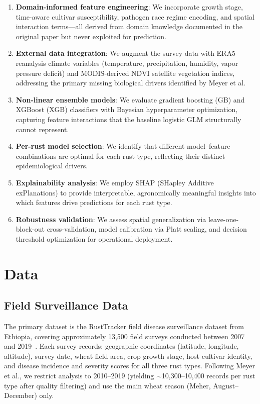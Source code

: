 \documentclass[10pt,twocolumn,letterpaper]{article}
\begin{document}
\begin{enumerate}
\item \textbf{Domain-informed feature engineering}: We incorporate growth stage, time-aware cultivar susceptibility, pathogen race regime encoding, and spatial interaction terms---all derived from domain knowledge documented in the original paper but never exploited for prediction.

\item \textbf{External data integration}: We augment the survey data with ERA5 reanalysis climate variables (temperature, precipitation, humidity, vapor pressure deficit) and MODIS-derived NDVI satellite vegetation indices, addressing the primary missing biological drivers identified by Meyer et al.

\item \textbf{Non-linear ensemble models}: We evaluate gradient boosting (GB) and XGBoost (XGB) classifiers with Bayesian hyperparameter optimization, capturing feature interactions that the baseline logistic GLM structurally cannot represent.

\item \textbf{Per-rust model selection}: We identify that different model--feature combinations are optimal for each rust type, reflecting their distinct epidemiological drivers.

\item \textbf{Explainability analysis}: We employ SHAP (SHapley Additive exPlanations) to provide interpretable, agronomically meaningful insights into which features drive predictions for each rust type.

\item \textbf{Robustness validation}: We assess spatial generalization via leave-one-block-out cross-validation, model calibration via Platt scaling, and decision threshold optimization for operational deployment.
\end{enumerate}

\section{Data}
\label{sec:data}

\subsection{Field Surveillance Data}

The primary dataset is the RustTracker field disease surveillance dataset from Ethiopia, covering approximately 13,500 field surveys conducted between 2007 and 2019~\cite{meyer2021}. Each survey records: geographic coordinates (latitude, longitude, altitude), survey date, wheat field area, crop growth stage, host cultivar identity, and disease incidence and severity scores for all three rust types. Following Meyer et al., we restrict analysis to 2010--2019 (yielding ${\sim}$10,300--10,400 records per rust type after quality filtering) and use the main wheat season (Meher, August--December) only.
\end{document}
